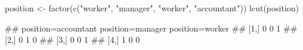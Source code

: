 \begin{Schunk}
% --begin: "lcut.factor"
\begin{Sinput}
position <- factor(c("worker", "manager", "worker", "accountant"))
lcut(position)
\end{Sinput}
\begin{Soutput}
##      position=accountant position=manager position=worker
## [1,]                   0                0               1
## [2,]                   0                1               0
## [3,]                   0                0               1
## [4,]                   1                0               0
\end{Soutput}
%
% --end: "lcut.factor"
\end{Schunk}
